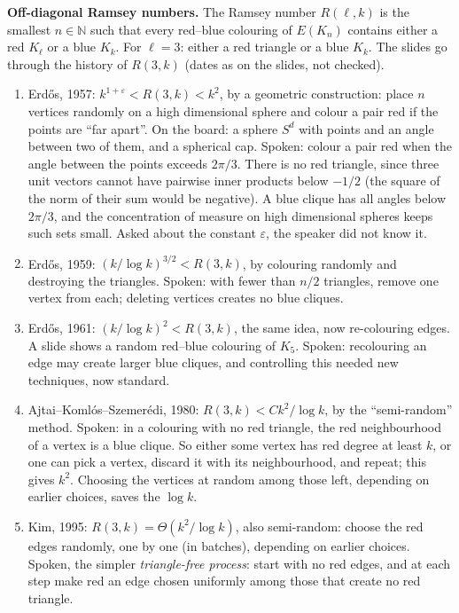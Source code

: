 \medskip\noindent
{\bf Off-diagonal Ramsey numbers.} The
Ramsey number $R(\ell,k)$ is the smallest
$n \in \mathbb{N}$ such that every red--blue
colouring of $E(K_n)$ contains either a red
$K_\ell$ or a blue $K_k$. For $\ell = 3$:
either a red triangle or a blue $K_k$. The
slides go through the history of $R(3,k)$
(dates as on the slides, not checked).
\begin{enumerate}
\item Erd\H{o}s, 1957:
$k^{1+\varepsilon} < R(3,k) < k^2$, by a
geometric construction: place $n$ vertices
randomly on a high dimensional sphere and
colour a pair red if the points are ``far
apart''. On the board: a sphere $S^d$ with
points and an angle between two of them, and
a spherical cap. Spoken: colour a pair red
when the angle between the points exceeds
$2\pi/3$. There is no red triangle, since
three unit vectors cannot have pairwise inner
products below $-1/2$ (the square of the norm
of their sum would be negative). A blue
clique has all angles below $2\pi/3$, and the
concentration of measure on high dimensional
spheres keeps such sets small. Asked about
the constant $\varepsilon$, the speaker did
not know it.
\item Erd\H{o}s, 1959:
$(k/\log k)^{3/2} < R(3,k)$, by colouring
randomly and destroying the triangles.
Spoken: with fewer than $n/2$ triangles,
remove one vertex from each; deleting
vertices creates no blue cliques.
\item Erd\H{o}s, 1961:
$(k/\log k)^2 < R(3,k)$, the same idea, now
re-colouring edges. A slide shows a random
red--blue colouring of $K_5$. Spoken:
recolouring an edge may create larger blue
cliques, and controlling this needed new
techniques, now standard.
\item Ajtai--Koml\'os--Szemer\'edi, 1980:
$R(3,k) < C k^2/\log k$, by the
``semi-random'' method. Spoken: in a
colouring with no red triangle, the red
neighbourhood of a vertex is a blue clique.
So either some vertex has red degree at
least $k$, or one can pick a vertex, discard
it with its neighbourhood, and repeat; this
gives $k^2$. Choosing the vertices at random
among those left, depending on earlier
choices, saves the $\log k$.
\item Kim, 1995:
$R(3,k) = \Theta(k^2/\log k)$, also
semi-random: choose the red edges randomly,
one by one (in batches), depending on
earlier choices. Spoken, the simpler
\emph{triangle-free process}: start with no
red edges, and at each step make red an edge
chosen uniformly among those that create no
red triangle.
\end{enumerate}

